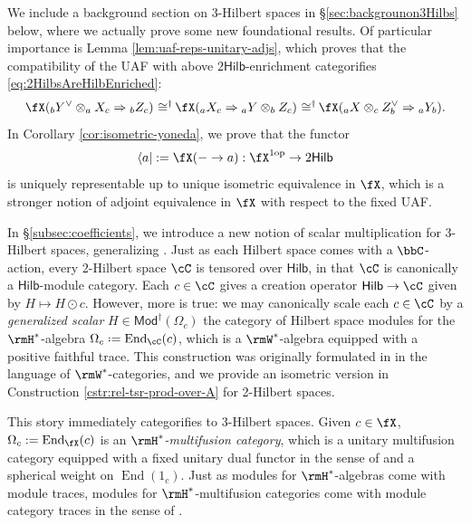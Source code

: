 \documentclass[12pt, reqno]{amsart}
\DeclareMathOperator{\End}{End}
\newcommand{\op}{\mathrm{op}}
\newcommand{\Mod}{\mathsf{Mod}}
\newcommand{\Hilb}{\mathsf{Hilb}}
\theoremstyle{plain}
\theoremstyle{definition}
\newcommand{\coloneq}{:=}
\def\coloneq{\mathrel{\vcenter{\baselineskip0.55ex\lineskiplimit0pt\hbox{\upshape.}\hbox{\upshape.}}}=}
\DeclareMathOperator{\isomeq}{\mathbin{\,\cong^\dag}}
\begin{document}
We include a background section on 3-Hilbert spaces in \S\ref{sec:backgrounon3Hilbs} below, where we actually prove some new foundational results.
Of particular importance is Lemma \ref{lem:uaf-reps-unitary-adjs}, which proves that the compatibility of the UAF with above $2\Hilb$-enrichment categorifies \eqref{eq:2HilbsAreHilbEnriched}:
$$
\fX({}_bY^\vee \otimes_a X_c \Rightarrow {}_bZ_c) \isomeq
\fX({}_aX_c \Rightarrow {}_aY\otimes_b Z_c) \isomeq
\fX({}_a X \otimes_c Z^\vee_b \Rightarrow {}_aY_b).
$$
In Corollary \ref{cor:isometric-yoneda}, we prove that the functor
\begin{equation}
\label{eq:BraFuUnctors}
\langle a| :=\fX(-\to a) : \fX^{1\op}\to 2\Hilb
\end{equation}
is uniquely representable up to unique isometric equivalence in $\fX$, which is a stronger notion of adjoint equivalence in $\fX$ with respect to the fixed UAF.

In \S\ref{subsec:coefficients}, we introduce a new notion of scalar multiplication for 3-Hilbert spaces, generalizing \cite[(11)]{2411.01678}.
Just as each Hilbert space comes with a $\bbC$-action, every 2-Hilbert space $\cC$ is tensored over $\Hilb$, in that $\cC$ is canonically a $\Hilb$-module category.
Each $c\in\cC$ gives a creation operator $\Hilb\to \cC$ given by $H\mapsto H\odot c$. 
However, more is true: we may canonically scale each $c\in \cC$ by a \emph{generalized scalar} $H\in \Mod^\dag(\Omega_c)$
the category of Hilbert space modules for the $\rmH^*$-algebra $\Omega_c\coloneq\End_\cC(c)$, which is a $\rmW^*$-algebra equipped with a positive faithful trace.
This construction was originally formulated in \cite[(11)]{2411.01678} in the language of $\rmW^*$-categories, and we provide an isometric version in Construction \ref{cstr:rel-tsr-prod-over-A} for 2-Hilbert spaces.

This story immediately categorifies to 3-Hilbert spaces.
Given $c\in \fX$, $\Omega_c:=\End_\fX(c)$ is an \emph{$\rmH^*$-multifusion category}, which is a unitary multifusion category equipped with a fixed unitary dual functor in the sense of \cite{MR4133163} and a spherical weight on $\End(1_c)$.
Just as modules for $\rmH^*$-algebras come with module traces, modules for $\rmH^*$-multifusion categories come with module category traces in the sense of \cite{MR3019263,MR4598730}.
\end{document}
